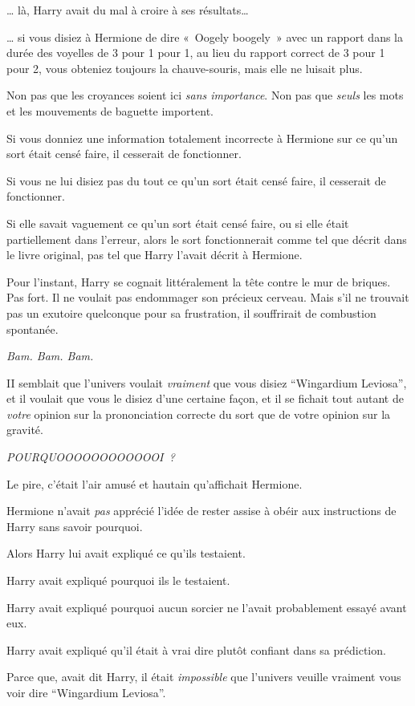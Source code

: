 … là, Harry avait du mal à croire à ses résultats…

… si vous disiez à Hermione de dire «~Oogely boogely~» avec un rapport dans la durée des voyelles de 3 pour 1 pour 1, au lieu du rapport correct de 3 pour 1 pour 2, vous obteniez toujours la chauve-souris, mais elle ne luisait plus.

Non pas que les croyances soient ici \emph{sans importance}.
Non pas que \emph{seuls} les mots et les mouvements de baguette importent.

Si vous donniez une information totalement incorrecte à Hermione sur ce qu'un sort était censé faire, il cesserait de fonctionner.

Si vous ne lui disiez pas du tout ce qu'un sort était censé faire, il cesserait de fonctionner.

Si elle savait vaguement ce qu'un sort était censé faire, ou si elle était partiellement dans l'erreur, alors le sort fonctionnerait comme tel que décrit dans le livre original, pas tel que Harry l'avait décrit à Hermione.

Pour l'instant, Harry se cognait littéralement la tête contre le mur de briques.
Pas fort.
Il ne voulait pas endommager son précieux cerveau.
Mais s'il ne trouvait pas un exutoire quelconque pour sa frustration, il souffrirait de combustion spontanée.

\emph{Bam.
Bam. Bam.}

II semblait que l'univers voulait \emph{vraiment} que vous disiez “Wingardium Leviosa”, et il voulait que vous le disiez d'une certaine façon, et il se fichait tout autant de \emph{votre} opinion sur la prononciation correcte du sort que de votre opinion sur la gravité.

\emph{POURQUOOOOOOOOOOOOI~?}

Le pire, c'était l'air amusé et hautain qu'affichait Hermione.

Hermione n'avait \emph{pas} apprécié l'idée de rester assise à obéir aux instructions de Harry sans savoir pourquoi.

Alors Harry lui avait expliqué ce qu'ils testaient.

Harry avait expliqué pourquoi ils le testaient.

Harry avait expliqué pourquoi aucun sorcier ne l'avait probablement essayé avant eux.

Harry avait expliqué qu'il était à vrai dire plutôt confiant dans sa prédiction.

Parce que, avait dit Harry, il était \emph{impossible} que l'univers veuille vraiment vous voir dire “Wingardium Leviosa”.

